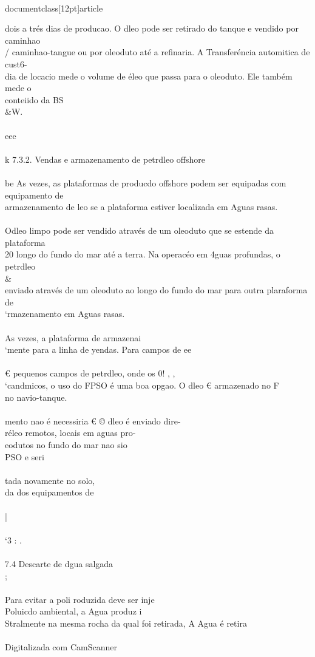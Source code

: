 \\documentclass[12pt]{article}
\begin{document}
dois a trés dias de producao. O dleo pode ser retirado do tanque e vendido por caminhao\\
/ caminhao-tangue ou por oleoduto até a refinaria. A Transferéncia automitica de cust6-\\
dia de locacio mede o volume de éleo que passa para o oleoduto. Ele também mede o\\
conteiido da BS\\&W.\\
\\
eee\\
\\
k 7.3.2. Vendas e armazenamento de petrdleo offshore\\
\\
be As vezes, as plataformas de producdo offshore podem ser equipadas com equipamento de\\
armazenamento de leo se a plataforma estiver localizada em Aguas rasas.\\
\\
Odleo limpo pode ser vendido através de um oleoduto que se estende da plataforma\\
20 longo do fundo do mar até a terra. Na operacéo em 4guas profundas, o petrdleo \\&\\
enviado através de um oleoduto ao longo do fundo do mar para outra plaraforma de\\
‘rmazenamento em Aguas rasas.\\
\\
As vezes, a plataforma de armazenai\\
‘mente para a linha de yendas. Para campos de ee\\
\\
€ pequenos campos de petrdleo, onde os 0! , ,\\
‘candmicos, o uso do FPSO é uma boa opgao. O dleo € armazenado no F\\
no navio-tanque.\\
\\
mento nao é necessiria € © dleo é enviado dire-\\
réleo remotos, locais em aguas pro-\\
eodutos no fundo do mar nao sio\\
PSO e seri\\
\\
tada novamente no solo,\\
da dos equipamentos de\\
\\
|\\
\\
‘3 : .\\
\\
7.4 Descarte de dgua salgada\\
;\\
\\
Para evitar a poli roduzida deve ser inje\\
Poluicdo ambiental, a Agua produz i\\
Stralmente na mesma rocha da qual foi retirada, A Agua é retira\\
\\
Digitalizada com CamScanner\\
\end{document}
